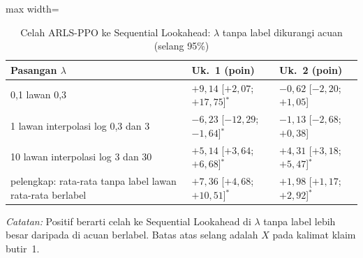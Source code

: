 \begin{table}[htbp]
\caption{Celah ARLS-PPO ke Sequential Lookahead: $\lambda$ tanpa label dikurangi acuan (selang 95\%)}
\label{tab:uji-butir1}
\centering\footnotesize
\setlength{\tabcolsep}{4pt}
\begin{adjustbox}{max width=\textwidth}
\begin{tabular}{p{6cm}ll}
\toprule
Pasangan $\lambda$ & Uk.~1 (poin) & Uk.~2 (poin) \\
\midrule
0,1 lawan 0,3 & $+9{,}14$ [$+2{,}07$; $+17{,}75$]$^{*}$ & $-0{,}62$ [$-2{,}20$; $+1{,}05$] \\
1 lawan interpolasi log 0,3 dan 3 & $-6{,}23$ [$-12{,}29$; $-1{,}64$]$^{*}$ & $-1{,}13$ [$-2{,}68$; $+0{,}38$] \\
10 lawan interpolasi log 3 dan 30 & $+5{,}14$ [$+3{,}64$; $+6{,}68$]$^{*}$ & $+4{,}31$ [$+3{,}18$; $+5{,}47$]$^{*}$ \\
pelengkap: rata-rata tanpa label lawan rata-rata berlabel & $+7{,}36$ [$+4{,}68$; $+10{,}51$]$^{*}$ & $+1{,}98$ [$+1{,}17$; $+2{,}92$]$^{*}$ \\
\bottomrule
\end{tabular}
\end{adjustbox}
\par\smallskip\footnotesize\textit{Catatan:} Positif berarti celah ke Sequential Lookahead di $\lambda$ tanpa label lebih besar daripada di acuan berlabel. Batas atas selang adalah $X$ pada kalimat klaim butir~1.
\end{table}
